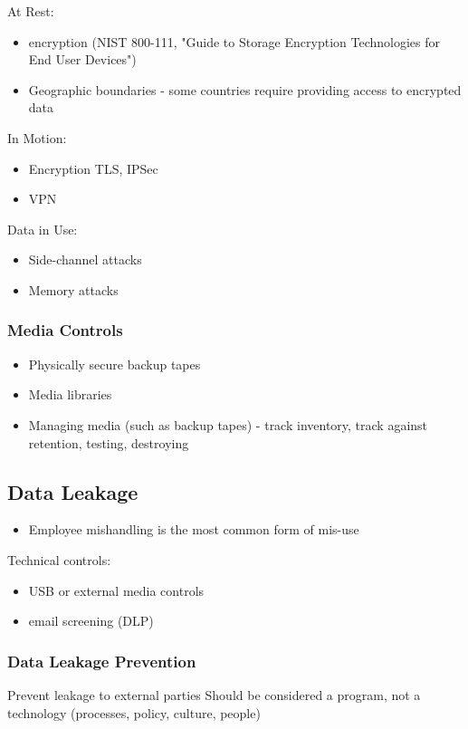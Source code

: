 \documentclass[11pt]{article}
\begin{document}
At Rest:
\begin{itemize}
\item encryption (NIST 800-111, "Guide to Storage Encryption Technologies for End User Devices")
\item Geographic boundaries - some countries require providing access to encrypted data
\end{itemize}

In Motion:
\begin{itemize}
\item Encryption TLS, IPSec
\item VPN
\end{itemize}

Data in Use:
\begin{itemize}
\item Side-channel attacks
\item Memory attacks
\end{itemize}
\subsubsection{Media Controls}
\label{sec:orgb148aa6}
\begin{itemize}
\item Physically secure backup tapes
\item Media libraries
\item Managing media (such as backup tapes) - track inventory, track against retention, testing, destroying
\end{itemize}
\subsection{Data Leakage}
\label{sec:org7fd2653}
\begin{itemize}
\item Employee mishandling is the most common form of mis-use
\end{itemize}
Technical controls:
\begin{itemize}
\item USB or external media controls
\item email screening (DLP)
\end{itemize}

\subsubsection{Data Leakage Prevention}
\label{sec:orgcb30a01}
Prevent leakage to external parties
Should be considered a program, not a technology (processes, policy, culture, people)
\end{document}
